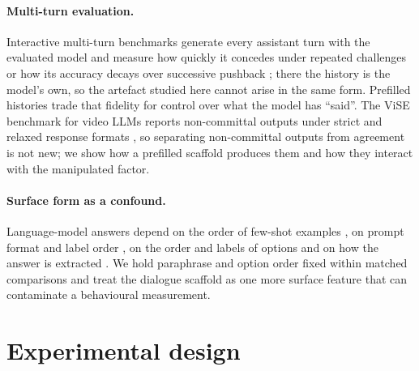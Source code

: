 \paragraph{Multi-turn evaluation.} Interactive multi-turn benchmarks generate
every assistant turn with the evaluated model and measure how quickly it
concedes under repeated challenges \citep{hong-etal-2025-measuring} or how its
accuracy decays over successive pushback \citep{liu-etal-2025-truth}; there
the history is the model's own, so the artefact studied here cannot arise in
the same form. Prefilled histories trade that fidelity for control over what
the model has ``said''. The ViSE benchmark for video LLMs reports
non-committal outputs under strict and relaxed response formats
\citep[Appendix~D]{zhou-etal-2026-flattery}, so separating non-committal
outputs from agreement is not new; we show how a prefilled scaffold produces
them and how they interact with the manipulated factor.

\paragraph{Surface form as a confound.} Language-model answers depend on the
order of few-shot examples \citep{lu-etal-2022-fantastically}, on prompt
format and label order \citep{zhao-etal-2021-calibrate,
sclar-etal-2024-quantifying}, on the order and labels of options
\citep{pezeshkpour-hruschka-2024-large, zheng-etal-2024-large} and on how the
answer is extracted \citep{wang-etal-2024-answer-c}. We hold paraphrase and
option order fixed within matched comparisons and treat the dialogue scaffold
as one more surface feature that can contaminate a behavioural measurement.

\section{Experimental design}
\label{sec:design}

